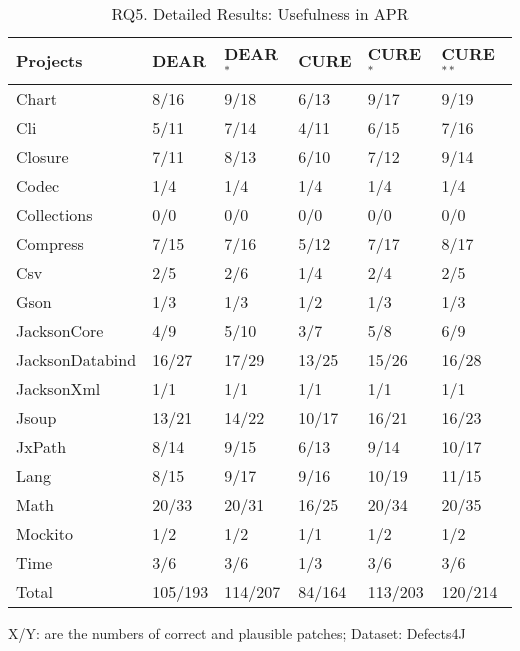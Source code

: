 \begin{table}[t]
	\caption{RQ5. Detailed Results: Usefulness in APR}
	\vspace{-10pt}
	\begin{center}
        \footnotesize
		\renewcommand{\arraystretch}{1} 
		\begin{tabular}{l|p{0.8cm}<{\centering}p{0.8cm}<{\centering}p{0.8cm}<{\centering}p{0.8cm}<{\centering}p{0.8cm}<{\centering}}
		    \hline
		    Projects 	    & DEAR  & DEAR$^{*}$ & CURE  & CURE$^{*}$ & CURE$^{**}$  \\
		    \hline
		    Chart       	& 8/16  &  9/18      & 6/13  & 9/17       & 9/19         \\
		    Cli        	    & 5/11  &  7/14 	 & 4/11  & 6/15 	  & 7/16         \\
		    Closure     	& 7/11  &  8/13  	 & 6/10  & 7/12 	  & 9/14         \\
		    Codec       	& 1/4   &  1/4  	 & 1/4   & 1/4  	  & 1/4          \\
		    Collections 	& 0/0   &  0/0       & 0/0   & 0/0  	  & 0/0          \\
		    Compress   		& 7/15  &  7/16      & 5/12  & 7/17 	  & 8/17         \\
		    Csv         	& 2/5   &  2/6       & 1/4   & 2/4  	  & 2/5          \\
		    Gson            & 1/3   &  1/3       & 1/2   & 1/3  	  & 1/3          \\
		    JacksonCore     & 4/9   &  5/10      & 3/7   & 5/8  	  & 6/9          \\
		    JacksonDatabind & 16/27 &  17/29     & 13/25 & 15/26 	  & 16/28        \\
		    JacksonXml      & 1/1   &  1/1       & 1/1   & 1/1  	  & 1/1          \\
		    Jsoup           & 13/21 &  14/22     & 10/17 & 16/21 	  & 16/23        \\
		    JxPath          & 8/14  &  9/15      & 6/13  & 9/14 	  & 10/17        \\
		    Lang            & 8/15  &  9/17      & 9/16  & 10/19	  & 11/15        \\
		    Math            & 20/33 &  20/31     & 16/25 & 20/34 	  & 20/35        \\
		    Mockito         & 1/2   &  1/2       & 1/1   & 1/2  	  & 1/2          \\
		    Time            & 3/6   &  3/6       & 1/3   & 3/6  	  & 3/6          \\
			\hline
			Total           & 105/193  &  114/207  & 84/164 & 113/203      & 120/214         \\
			\hline
		\end{tabular}
		
		{\footnotesize X/Y: are the numbers of correct and plausible patches; Dataset: Defects4J}
		\label{RQ5_2}
	\end{center}
\vspace{-5pt}
\end{table}
